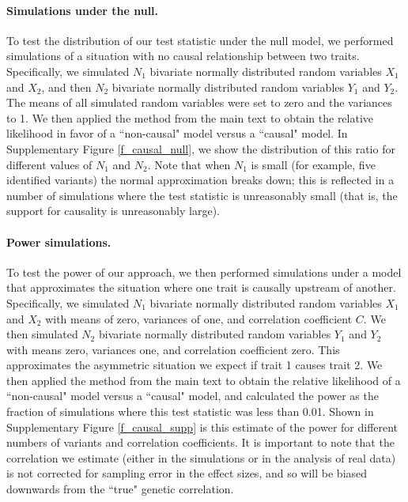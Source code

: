 \documentclass[11pt,titlepage]{article}
\begin{document}
\paragraph{Simulations under the null.}
To test the distribution of our test statistic under the null model, we performed simulations of a situation with no causal relationship between two traits. Specifically, we simulated $N_1$ bivariate normally distributed random variables $X_1$ and $X_2$, and then $N_2$ bivariate normally distributed random variables $Y_1$ and $Y_2$. The means of all simulated random variables were set to zero and the variances to 1. We then applied the method from the main text to obtain the relative likelihood in favor of a ``non-causal" model versus a ``causal" model. In Supplementary Figure \ref{f_causal_null}, we show the distribution of this ratio for different values of $N_1$ and $N_2$. Note that when $N_1$ is small (for example, five identified variants) the normal approximation breaks down; this is reflected in a number of simulations where the test statistic is unreasonably small (that is, the support for causality is unreasonably large). 

\paragraph{Power simulations.}
To test the power of our approach, we then performed simulations under a model that approximates the situation where one trait is causally upstream of another. Specifically, we simulated $N_1$ bivariate normally distributed random variables $X_1$ and $X_2$ with means of zero, variances of one, and correlation coefficient $C$. We then simulated $N_2$ bivariate normally distributed random variables $Y_1$ and $Y_2$ with means zero, variances one, and correlation coefficient zero. This approximates the asymmetric situation we expect if trait 1 causes trait 2. We then applied the method from the main text to obtain the relative likelihood of a ``non-causal" model versus a ``causal" model, and calculated the power as the fraction of simulations where this test statistic was less than 0.01. Shown in Supplementary Figure \ref{f_causal_supp} is this estimate of the power for different numbers of variants and correlation coefficients. It is important to note that the correlation we estimate (either in the simulations or in the analysis of real data) is not corrected for sampling error in the effect sizes, and so will be biased downwards from the ``true" genetic correlation. 
\end{document}
